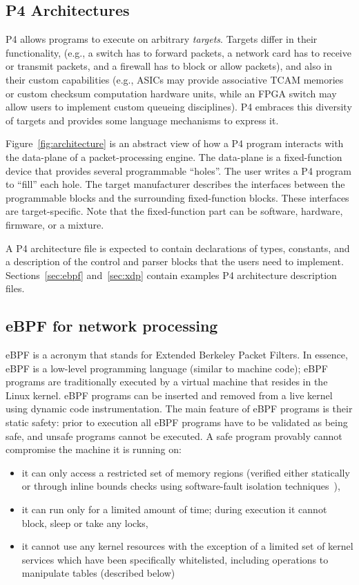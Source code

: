 \subsection{P4 Architectures}

P4 allows programs to execute on arbitrary \emph{targets}.  Targets
differ in their functionality, (e.g., a switch has to forward packets,
a network card has to receive or transmit packets, and a firewall has
to block or allow packets), and also in their custom capabilities
(e.g., ASICs may provide associative TCAM memories or custom checksum
computation hardware units, while an FPGA switch may allow users to
implement custom queueing disciplines).  P4 embraces this diversity of
targets and provides some language mechanisms to express it.


Figure~\ref{fig:architecture} is an abstract view of how a P4 program
interacts with the data-plane of a packet-processing engine.  The
data-plane is a fixed-function device that provides several
programmable ``holes''. The user writes a P4 program to ``fill'' each
hole.  The target manufacturer describes the interfaces between the
programmable blocks and the surrounding fixed-function blocks.  These
interfaces are target-specific.  Note that the fixed-function part can
be software, hardware, firmware, or a mixture.

A P4 architecture file is expected to contain declarations of types,
constants, and a description of the control and parser blocks that the
users need to implement.  Sections~\ref{sec:ebpf} and~\ref{sec:xdp}
contain examples P4 architecture description files.

\subsection{eBPF for network processing}

eBPF is a
acronym that stands for Extended Berkeley Packet Filters. In essence,
eBPF is a low-level programming language (similar to machine code);
eBPF programs are traditionally executed by a virtual machine that
resides in the Linux kernel. eBPF programs can be inserted and removed
from a live kernel using dynamic code instrumentation. The main
feature of eBPF programs is their static safety: prior to execution
all eBPF programs have to be validated as being safe, and unsafe
programs cannot be executed. A safe program provably cannot compromise
the machine it is running on:
\begin{itemize}
\item it can only access a restricted set of memory regions (verified
  either statically or through inline bounds checks using
  software-fault isolation techniques~\cite{wahbe:93}),
\item it can run only for a limited amount of time; during execution
  it cannot block, sleep or take any locks,
\item it cannot use any kernel resources with the exception of a
  limited set of kernel services which have been specifically
  whitelisted, including operations to manipulate tables (described
  below)
\end{itemize}

